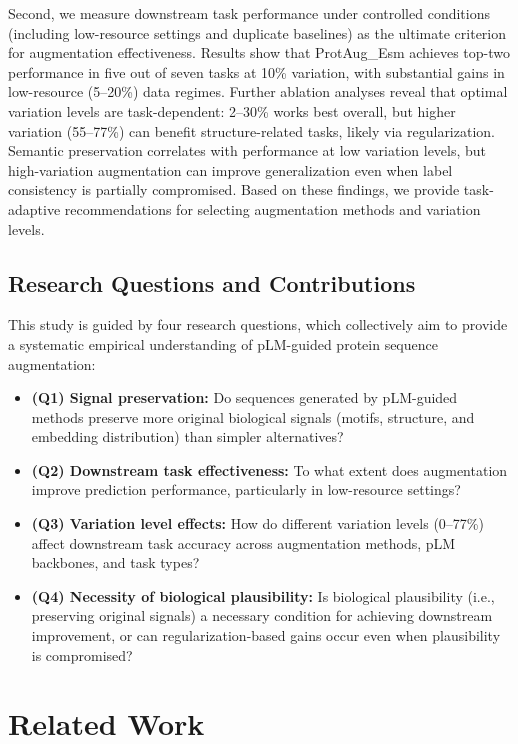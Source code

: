 \documentclass{article}
\begin{document}
Second, we measure downstream task performance under controlled conditions (including low-resource settings and duplicate baselines) as the ultimate criterion for augmentation effectiveness. Results show that ProtAug\_Esm achieves top-two performance in five out of seven tasks at 10\% variation, with substantial gains in low-resource (5–20\%) data regimes. Further ablation analyses reveal that optimal variation levels are task-dependent: 2–30\% works best overall, but higher variation (55–77\%) can benefit structure-related tasks, likely via regularization. Semantic preservation correlates with performance at low variation levels, but high-variation augmentation can improve generalization even when label consistency is partially compromised. Based on these findings, we provide task-adaptive recommendations for selecting augmentation methods and variation levels.


\subsection*{Research Questions and Contributions}
This study is guided by four research questions, which collectively aim to provide a systematic empirical understanding of pLM-guided protein sequence augmentation:

\begin{itemize}
    \item \textbf{(Q1) Signal preservation:} Do sequences generated by pLM-guided methods preserve more original biological signals (motifs, structure, and embedding distribution) than simpler alternatives?
    \item \textbf{(Q2) Downstream task effectiveness:} To what extent does augmentation improve prediction performance, particularly in low-resource settings?
    \item \textbf{(Q3) Variation level effects:} How do different variation levels (0–77\%) affect downstream task accuracy across augmentation methods, pLM backbones, and task types?
    \item \textbf{(Q4) Necessity of biological plausibility:} Is biological plausibility (i.e., preserving original signals) a necessary condition for achieving downstream improvement, or can regularization-based gains occur even when plausibility is compromised?
\end{itemize}

\section{Related Work}
\end{document}
